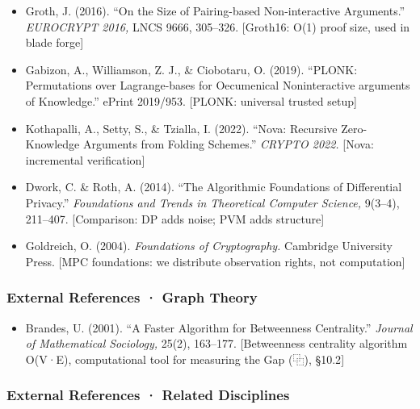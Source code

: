 \documentclass[
  11pt,
]{article}
\providecommand{\tightlist}{%
  \setlength{\itemsep}{0pt}\setlength{\parskip}{0pt}}
\begin{document}
\begin{itemize}
\tightlist
\item
  Groth, J. (2016). ``On the Size of Pairing-based Non-interactive
  Arguments.'' \emph{EUROCRYPT 2016,} LNCS 9666, 305--326. {[}Groth16:
  O(1) proof size, used in blade forge{]}
\item
  Gabizon, A., Williamson, Z. J., \& Ciobotaru, O. (2019). ``PLONK:
  Permutations over Lagrange-bases for Oecumenical Noninteractive
  arguments of Knowledge.'' ePrint 2019/953. {[}PLONK: universal trusted
  setup{]}
\item
  Kothapalli, A., Setty, S., \& Tzialla, I. (2022). ``Nova: Recursive
  Zero-Knowledge Arguments from Folding Schemes.'' \emph{CRYPTO 2022.}
  {[}Nova: incremental verification{]}
\item
  Dwork, C. \& Roth, A. (2014). ``The Algorithmic Foundations of
  Differential Privacy.'' \emph{Foundations and Trends in Theoretical
  Computer Science,} 9(3--4), 211--407. {[}Comparison: DP adds noise;
  PVM adds structure{]}
\item
  Goldreich, O. (2004). \emph{Foundations of Cryptography.} Cambridge
  University Press. {[}MPC foundations: we distribute observation
  rights, not computation{]}
\end{itemize}

\subsubsection{External References · Graph
Theory}\label{external-references-graph-theory}

\begin{itemize}
\tightlist
\item
  Brandes, U. (2001). ``A Faster Algorithm for Betweenness Centrality.''
  \emph{Journal of Mathematical Sociology,} 25(2), 163--177.
  {[}Betweenness centrality algorithm O(V·E), computational tool for
  measuring the Gap (⿻), §10.2{]}
\end{itemize}

\subsubsection{External References · Related
Disciplines}\label{external-references-related-disciplines}
\end{document}
